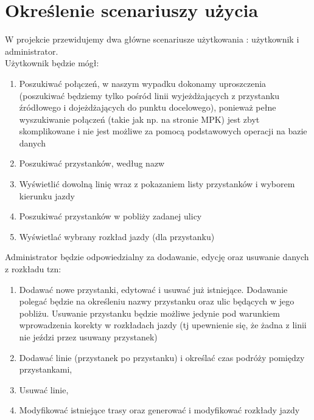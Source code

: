 \section{Określenie scenariuszy użycia}
W projekcie przewidujemy dwa główne scenariusze użytkowania : użytkownik i administrator.\\
Użytkownik będzie mógł:
\begin{enumerate}
\item Poszukiwać połączeń, w naszym wypadku dokonamy uproszczenia (poszukiwać będziemy tylko pośród linii wyjeżdżających z przystanku źródłowego i dojeżdżających do punktu docelowego), ponieważ pełne wyszukiwanie połączeń (takie jak np. na stronie MPK) 
jest zbyt skomplikowane i nie jest możliwe za pomocą podstawowych operacji na bazie danych
\item Poszukiwać przystanków, według nazw
\item Wyświetlić dowolną linię wraz z pokazaniem listy przystanków i wyborem kierunku jazdy
\item Poszukiwać przystanków w pobliży zadanej ulicy
\item Wyświetlać wybrany rozkład jazdy (dla przystanku)
\end{enumerate}

Administrator będzie odpowiedzialny za dodawanie, edycję oraz usuwanie danych z rozkładu tzn:
\begin{enumerate}
\item Dodawać nowe przystanki, edytować i usuwać już istniejące. Dodawanie polegać będzie na określeniu nazwy przystanku oraz ulic będących w jego pobliżu.
Usuwanie przystanku będzie możliwe jedynie pod warunkiem wprowadzenia korekty w rozkładach jazdy (tj upewnienie się, że żadna z linii nie
jeździ przez usuwany przystanek)
\item Dodawać linie  (przystanek po przystanku) i określać czas podróży pomiędzy przystankami,
\item Usuwać linie,
\item Modyfikować istniejące trasy oraz generować i modyfikować rozkłady jazdy
\end{enumerate}


